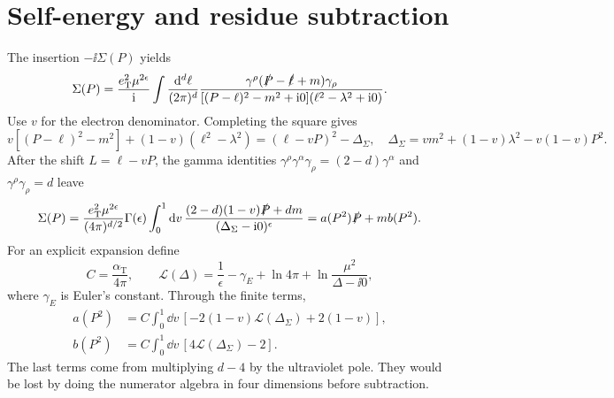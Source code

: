 \section{Self-energy and residue subtraction}
The insertion $-\ii\Sigma(P)$ yields
\begin{equation}
 \Sigma(P)=\frac{e_{\mathrm T}^2\mu^{2\epsilon}}{\mathrm{i}}
 \int\frac{\dd^d\ell}{(2\pi)^d}
 \frac{\gamma^\rho(\slashed P-\slashed\ell+m)\gamma_\rho}
 {[(P-\ell)^2-m^2+\mathrm{i}0](\ell^2-\lambda^2+\mathrm{i}0)}.
\end{equation}
Use $v$ for the electron denominator. Completing the square gives
\begin{equation}
 v[(P-\ell)^2-m^2]+(1-v)(\ell^2-\lambda^2)
 = (\ell-vP)^2-\Delta_\Sigma,
 \quad \Delta_\Sigma=vm^2+(1-v)\lambda^2-v(1-v)P^2.
\end{equation}
After the shift $L=\ell-vP$, the gamma identities
$\gamma^\rho\gamma^\alpha\gamma_\rho=(2-d)\gamma^\alpha$
and $\gamma^\rho\gamma_\rho=d$ leave
\begin{equation}
 \Sigma(P)=\frac{e_{\mathrm T}^2\mu^{2\epsilon}}{(4\pi)^{d/2}}
 \Gamma(\epsilon)\int_0^1\dd v\,
 \frac{(2-d)(1-v)\slashed P+dm}{(\Delta_\Sigma-\mathrm{i}0)^\epsilon}
 =a(P^2)\slashed P+mb(P^2).
\end{equation}
For an explicit expansion define
\begin{equation}
 C=\frac{\alpha_{\mathrm T}}{4\pi},\qquad
 \mathcal L(\Delta)=\frac1\epsilon-\gamma_E+\ln4\pi
                         +\ln\frac{\mu^2}{\Delta-\ii0},
\end{equation}
where $\gamma_E$ is Euler's constant. Through the finite terms,
\begin{align}
 a(P^2)&=C\int_0^1\dd v\,
       [-2(1-v)\mathcal L(\Delta_\Sigma)+2(1-v)],\\
 b(P^2)&=C\int_0^1\dd v\,[4\mathcal L(\Delta_\Sigma)-2].
\end{align}
The last terms come from multiplying $d-4$ by the ultraviolet pole.
They would be lost by doing the numerator algebra in four dimensions
before subtraction.

